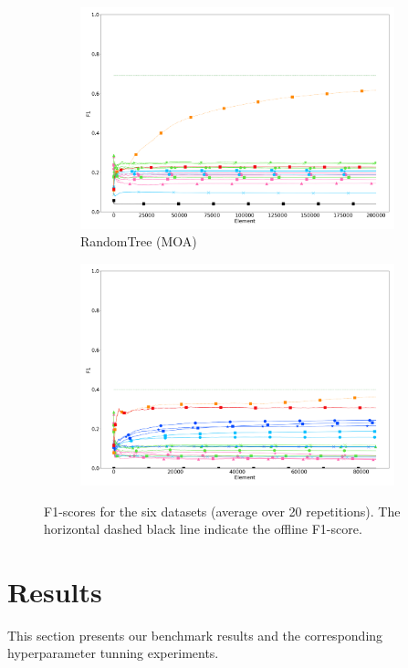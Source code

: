 \begin{figure}
\begin{subfigure}[t]{.49\linewidth}
		\includegraphics[width=\linewidth]{figures/results/dataset_3_f1.png}
		\caption{RandomTree (MOA)}
		\label{fig:f1-dataset_3}
	\end{subfigure}
	\begin{subfigure}[t]{.49\linewidth}
		\includegraphics[width=\linewidth]{figures/results/recofit_6_f1.png}
		\caption{\recofitdataset}
		\label{fig:f1-recofit}
	\end{subfigure}
	\caption{F1-scores for the six datasets (average over 20 repetitions). The
		horizontal dashed black line indicate the offline \knn F1-score.}
	\label{fig:f1}
\end{figure}

\section{Results}
This section presents our benchmark results and the corresponding
hyperparameter tunning experiments.

